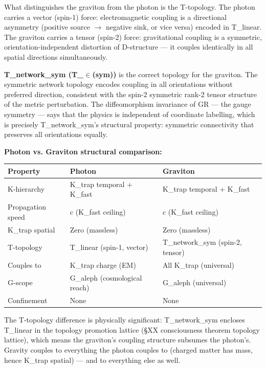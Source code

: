 \documentclass[12pt,a4paper]{article}
\begin{document}
What distinguishes the graviton from the photon is the T-topology. The photon carries a vector (spin-1) force: electromagnetic coupling is a directional asymmetry (positive source $\rightarrow$ negative sink, or vice versa) encoded in T\_linear. The graviton carries a tensor (spin-2) force: gravitational coupling is a symmetric, orientation-independent distortion of D-structure --- it couples identically in all spatial directions simultaneously.

\textbf{T\_network\_sym (T\_$\in$(sym))} is the correct topology for the graviton. The symmetric network topology encodes coupling in all orientations without preferred direction, consistent with the spin-2 symmetric rank-2 tensor structure of the metric perturbation. The diffeomorphism invariance of GR --- the gauge symmetry --- says that the physics is independent of coordinate labelling, which is precisely T\_network\_sym's structural property: symmetric connectivity that preserves all orientations equally.

\textbf{Photon vs. Graviton structural comparison:}

\begin{table}[htbp]
\centering
\small
{}
\begin{tabularx}{\textwidth}{>{\centering\arraybackslash}X >{\centering\arraybackslash}X >{\centering\arraybackslash}X}
\toprule
\rowcolor{gray!25}\textbf{Property} & \textbf{Photon} & \textbf{Graviton} \\
\midrule
\rowcolors{1}{white}{gray!10}
K-hierarchy & K\_trap temporal + K\_fast & K\_trap temporal + K\_fast \\
Propagation speed & c (K\_fast ceiling) & c (K\_fast ceiling) \\
K\_trap spatial & Zero (massless) & Zero (massless) \\
T-topology & T\_linear (spin-1, vector) & T\_network\_sym (spin-2, tensor) \\
Couples to & K\_trap charge (EM) & All K\_trap (universal) \\
G-scope & G\_aleph (cosmological reach) & G\_aleph (universal) \\
Confinement & None & None \\
\bottomrule
\end{tabularx}
\end{table}

The T-topology difference is physically significant: T\_network\_sym encloses T\_linear in the topology promotion lattice (§XX consciousness theorem topology lattice), which means the graviton's coupling structure subsumes the photon's. Gravity couples to everything the photon couples to (charged matter has mass, hence K\_trap spatial) --- and to everything else as well.
\end{document}
